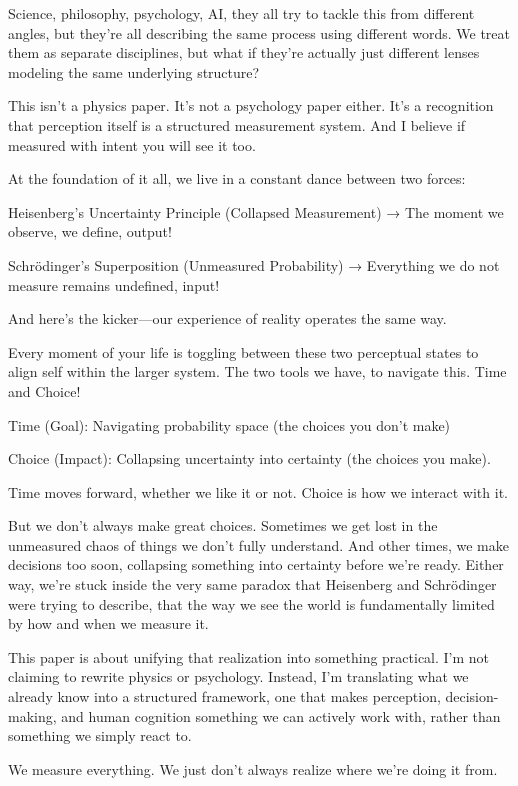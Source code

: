 \documentclass[11pt]{article}
\begin{document}
Science, philosophy, psychology, AI, they all try to tackle this from different angles, but they’re all describing the same process using different words. We treat them as separate disciplines, but what if they’re actually just different lenses modeling the same underlying structure?

This isn’t a physics paper. It’s not a psychology paper either. It’s a recognition that perception itself is a structured measurement system. And I believe if measured with intent you will see it too. 

At the foundation of it all, we live in a constant dance between two forces:

Heisenberg’s Uncertainty Principle (Collapsed Measurement) → The moment we observe, we define, output!

Schrödinger’s Superposition (Unmeasured Probability) → Everything we do not measure remains undefined, input!

And here’s the kicker—our experience of reality operates the same way.

Every moment of your life is toggling between these two perceptual states to align self within the larger system. The two tools we have, to navigate this. Time and Choice!

Time (Goal): Navigating probability space (the choices you don’t make)

Choice (Impact): Collapsing uncertainty into certainty (the choices you make).

Time moves forward, whether we like it or not. Choice is how we interact with it.

But we don’t always make great choices. Sometimes we get lost in the unmeasured chaos of things we don’t fully understand. And other times, we make decisions too soon, collapsing something into certainty before we’re ready. Either way, we’re stuck inside the very same paradox that Heisenberg and Schrödinger were trying to describe, that the way we see the world is fundamentally limited by how and when we measure it.

This paper is about unifying that realization into something practical. I’m not claiming to rewrite physics or psychology. Instead, I’m translating what we already know into a structured framework, one that makes perception, decision-making, and human cognition something we can actively work with, rather than something we simply react to.

We measure everything. We just don’t always realize where we’re doing it from.
\end{document}
